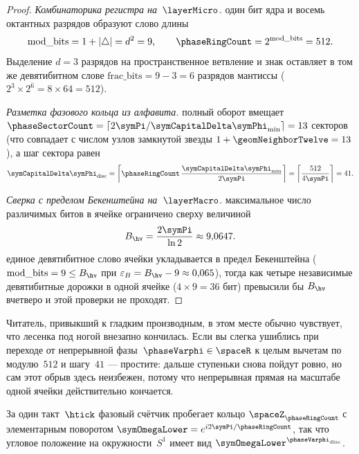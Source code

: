 \begin{proof}
\emph{Комбинаторика регистра на~$\layerMicro$.}
один бит ядра и восемь октантных разрядов образуют слово длины
\[
  \mathrm{mod\_bits} = 1 + |\triangle| = d^2 = 9,\qquad
  \phaseRingCount = 2^{\mathrm{mod\_bits}} = 512.
\]
Выделение $d=3$ разрядов на пространственное ветвление и знак оставляет в том же девятибитном слове $\mathrm{frac\_bits} = 9 - 3 = 6$ разрядов мантиссы ($2^3\times 2^6 = 8\times 64 = 512$).

\smallskip
\emph{Разметка фазового кольца из алфавита.}
полный оборот вмещает $\phaseSectorCount = \lceil 2\symPi/\symCapitalDelta\symPhi_{\min}\rceil = 13$ секторов (что совпадает с числом узлов замкнутой звезды $1+\geomNeighborTwelve=13$), а шаг сектора равен
\[
  \symCapitalDelta\symPhi_{\mathrm{disc}}
  = \left\lceil \phaseRingCount\,\frac{\symCapitalDelta\symPhi_{\min}}{2\symPi}\right\rceil = \left\lceil \frac{512}{4\symPi}\right\rceil = 41.
\]

\smallskip
\emph{Сверка с пределом Бекенштейна на~$\layerMacro$.}
максимальное число различимых битов в ячейке ограничено сверху величиной
\[
  B_{\hv} = \frac{2\symPi}{\ln 2}\approx 9{,}0647.
\]
\pfollows
единое девятибитное слово ячейки укладывается в предел Бекенштейна ($\mathrm{mod\_bits} = 9 \le B_{\hv}$ при $\varepsilon_B = B_{\hv} - 9 \approx 0{,}065$), тогда как четыре независимые девятибитные дорожки в одной ячейке ($4\times 9 = 36$ бит) превысили бы $B_{\hv}$ вчетверо и этой проверки не проходят.
\end{proof}

Читатель, привыкший к гладким производным, в этом месте обычно чувствует, что лесенка под ногой внезапно кончилась.
Если вы слегка ушиблись при переходе от непрерывной фазы~$\phaseVarphi\in\spaceR$ к целым вычетам по модулю~$512$ и шагу~$41$ --- простите: дальше ступеньки снова пойдут ровно, но сам этот обрыв здесь неизбежен, потому что непрерывная прямая на масштабе одной ячейки действительно кончается.

За один такт~$\htick$ фазовый счётчик пробегает кольцо $\spaceZ_{\phaseRingCount}$ с элементарным поворотом $\symOmegaLower = e^{i2\symPi/\phaseRingCount}$, так что угловое положение на окружности~$S^1$ имеет вид $\symOmegaLower^{\phaseVarphi_{\mathrm{disc}}}$.

